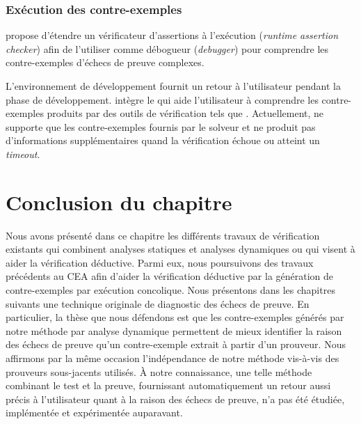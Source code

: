\subsubsection*{Exécution des contre-exemples}


\cite{Muller/FM11} propose d'étendre un vérificateur d'assertions à l'exécution
({\em runtime assertion checker}) afin de l'utiliser comme débogueur
({\em debugger}) pour comprendre les contre-exemples d'échecs de preuve
complexes.

L'environnement de développement \dafny \cite{Leino/FIDE14} fournit un retour à
l'utilisateur pendant la phase de développement.
\dafny intègre le  \cite{LeGoues/SEFM11}
qui aide l'utilisateur à comprendre les contre-exemples produits par des
outils de vérification tels que \boogie.
Actuellement, \dafny ne supporte que les contre-exemples fournis par le solveur
et ne produit pas d'informations supplémentaires quand la vérification échoue
ou atteint un {\em timeout}.


\section*{Conclusion du chapitre}


Nous avons présenté dans ce chapitre les différents travaux de vérification
existants qui combinent analyses statiques et analyses dynamiques ou qui visent
à aider la vérification déductive.
Parmi eux, nous poursuivons des travaux précédents au CEA afin d'aider la
vérification déductive par la génération de contre-exemples par exécution
concolique.
Nous présentons dans les chapitres suivants une technique originale de
diagnostic des échecs de preuve.
En particulier, la thèse que nous défendons est que les contre-exemples générés
par notre méthode par analyse dynamique permettent de mieux identifier la raison
des échecs de preuve qu'un contre-exemple extrait à partir d'un prouveur.
Nous affirmons par la même occasion l'indépendance de notre méthode vis-à-vis
des prouveurs sous-jacents utilisés.
À notre connaissance, une telle méthode combinant le test et la preuve,
fournissant automatiquement un retour aussi précis à l'utilisateur quant à la
raison des échecs de preuve, n'a pas été étudiée, implémentée et expérimentée
auparavant.

